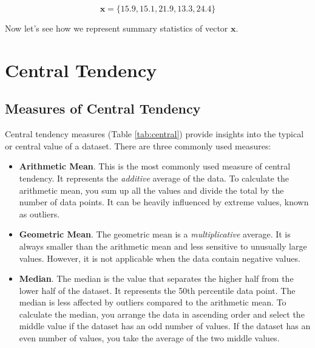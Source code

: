 \documentclass[
]{book}
\begin{document}
\[
\pmb{x} = \{15.9, 15.1, 21.9, 13.3, 24.4\}
\]

Now let's see how we represent summary statistics of vector \(\pmb{x}\).

\hypertarget{central-tendency}{%
\section{Central Tendency}\label{central-tendency}}

\hypertarget{measures-of-central-tendency}{%
\subsection{Measures of Central Tendency}\label{measures-of-central-tendency}}

Central tendency measures (Table \ref{tab:central}) provide insights into the typical or central value of a dataset. There are three commonly used measures:

\begin{itemize}
\item
  \textbf{Arithmetic Mean}. This is the most commonly used measure of central tendency. It represents the \emph{additive} average of the data. To calculate the arithmetic mean, you sum up all the values and divide the total by the number of data points. It can be heavily influenced by extreme values, known as outliers.
\item
  \textbf{Geometric Mean}. The geometric mean is a \emph{multiplicative} average. It is always smaller than the arithmetic mean and less sensitive to unusually large values. However, it is not applicable when the data contain negative values.
\item
  \textbf{Median}. The median is the value that separates the higher half from the lower half of the dataset. It represents the 50th percentile data point. The median is less affected by outliers compared to the arithmetic mean. To calculate the median, you arrange the data in ascending order and select the middle value if the dataset has an odd number of values. If the dataset has an even number of values, you take the average of the two middle values.
\end{itemize}
\end{document}
